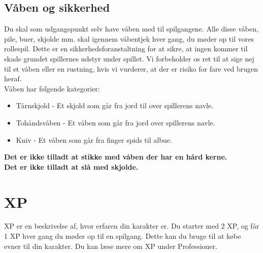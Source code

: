 \subsection{Våben og sikkerhed}
Du skal som udgangspunkt selv have våben med til spilgangene. Alle disse våben, pile, buer, skjolde mm. skal igennem våbentjek hver gang, du møder op til vores rollespil. Dette er en sikkerhedsforanstaltning for at sikre, at ingen kommer til skade grundet spillernes udstyr under spillet. Vi forbeholder os ret til at sige nej til et våben eller en rustning, hvis vi vurderer, at der er risiko for fare ved brugen heraf.\\
Våben har følgende kategorier:
\begin{itemize}
    \item Tårnskjold - Et skjold som går fra jord til over spillerens navle.
    \item Tohåndsvåben - Et våben som går fra jord over spillerens navle.
    \item Kniv - Et våben som går fra finger spids til albue.
\end{itemize}
\textbf{Det er ikke tilladt at stikke med våben der har en hård kerne.}\\ 
\textbf{Det er ikke tilladt at slå med skjolde.}\\

\section{XP}
XP er en beskrivelse af, hvor erfaren din karakter er. Du starter med 2 XP, og får 1 XP hver gang du møder op til en spilgang. Dette kan du bruge til at købe evner til din karakter. Du kan læse mere om XP under Professioner.

